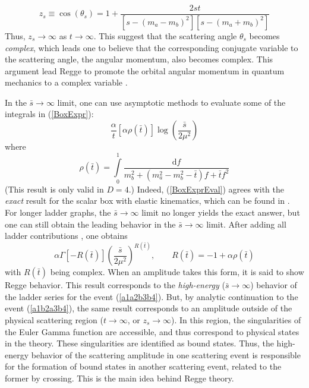 \begin{equation}
	z_{s} \equiv \cos{(\theta_{s})} = 1 + \frac{2 s t}{[s - (m_{a} - m_{b})^{2}] [s - (m_{a} + m_{b})^{2}]}
\end{equation}
Thus, $z_{s} \rightarrow \infty$ as $t \rightarrow \infty$. This suggest that the scattering angle $\theta_{s}$ becomes \textit{complex}, which leads one to believe that the corresponding conjugate variable to the scattering angle, the angular momentum, also becomes complex. This argument lead Regge to promote the orbital angular momentum in quantum mechanics to a complex variable \cite{Regge:1959mz,Regge:1960zc}.

In the $\bar{s} \rightarrow \infty$ limit, one can use asymptotic methods to evaluate some of the integrals in (\ref{BoxExpr}):
\begin{equation}
	\frac{\alpha}{t} [ \alpha \rho(\bar{t})] \log{\left( \frac{\bar{s}}{2 \mu^{2}} \right)} \label{BoxExprEval}
\end{equation}
where
\begin{equation}
	\rho(\bar{t}) = \int\limits_{0}^{1} \frac{\mathrm{d}f}{m_{b}^{2} + (m_{a}^{2} - m_{b}^{2} - \bar{t})f + \bar{t} f^{2}}
\end{equation}
(This result is only valid in $D = 4$.) Indeed, (\ref{BoxExprEval}) agrees with the \textit{exact} result for the scalar box with elastic kinematics, which can be found in \cite{PvN}. For longer ladder graphs, the $\bar{s} \rightarrow \infty$ limit no longer yields the exact answer, but one can still obtain the leading behavior in the $\bar{s} \rightarrow \infty$ limit. After adding all ladder contributions \cite{LeeSawyer}, one obtains
\begin{equation}
	\alpha \Gamma[-R(\bar{t})] \left( \frac{\bar{s}}{2 \mu^{2}} \right)^{R(\bar{t})}, \qquad R(\bar{t}) = -1 + \alpha \rho(\bar{t})
\end{equation}
with $R(\bar{t})$ being complex. When an amplitude takes this form, it is said to show Regge behavior. This result corresponds to the \textit{high-energy} ($\bar{s} \rightarrow \infty$) behavior of the ladder series for the event (\ref{a1a2b3b4}). But, by analytic continuation to the event (\ref{a1b2a3b4}), the same result corresponds to an amplitude outside of the physical scattering region ($t \rightarrow \infty$, or $z_{s} \rightarrow \infty$). In this region, the singularities of the Euler Gamma function are accessible, and thus correspond to physical states in the theory. These singularities are identified as bound states. Thus, the high-energy behavior of the scattering amplitude in one scattering event is responsible for the formation of bound states in another scattering event, related to the former by crossing. This is the main idea behind Regge theory.

